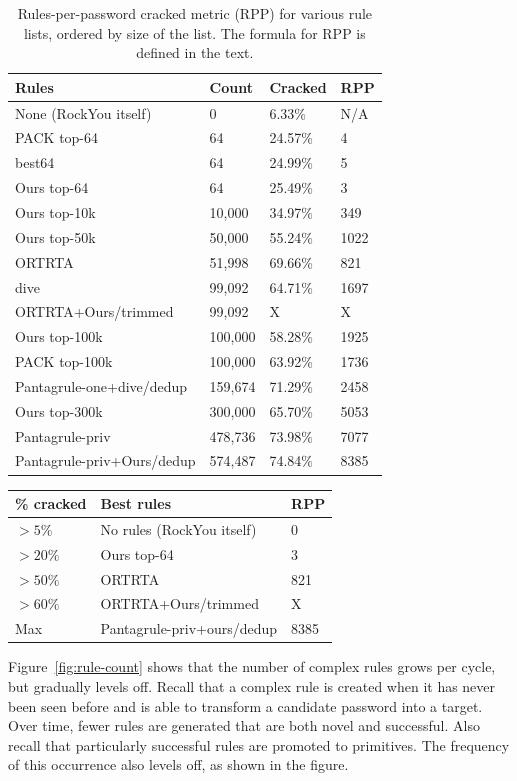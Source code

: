 \documentclass[letterpaper,twocolumn,10pt]{article}
\begin{document}
\begin{table}
\centering
\begin{tabular}{|l|l|l|l|}
  \hline
  Rules & Count & Cracked & RPP \\
  \hline
  None (RockYou itself) & 0 & 6.33\% & N/A \\
  PACK top-64 & 64 & 24.57\% & 4 \\
  best64 & 64 & 24.99\% & 5 \\
  Ours top-64 & 64 & 25.49\% & 3 \\
  Ours top-10k & 10,000 & 34.97\% & 349 \\
  Ours top-50k & 50,000 & 55.24\% & 1022 \\
  ORTRTA & 51,998 & 69.66\% & 821 \\
  dive & 99,092 & 64.71\% & 1697 \\
  ORTRTA+Ours/trimmed & 99,092 & X & X \\
  Ours top-100k & 100,000 & 58.28\% & 1925 \\
  PACK top-100k & 100,000 & 63.92\% & 1736 \\
  Pantagrule-one+dive/dedup & 159,674 & 71.29\% & 2458 \\
  Ours top-300k & 300,000 & 65.70\% & 5053 \\
  Pantagrule-priv & 478,736 & 73.98\% & 7077 \\
  Pantagrule-priv+Ours/dedup & 574,487 & 74.84\% & 8385 \\
  \hline
\end{tabular}
\caption{Rules-per-password cracked metric (RPP) for various rule lists, ordered by size of the list. The formula for RPP is defined in the text.}
\label{tab:rpp}
\end{table}

\begin{table}
\centering
\begin{tabular}{|l|l|l|}
    \hline
    \% cracked & Best rules & RPP \\
    \hline
    $>5\%$ & No rules (RockYou itself) & 0 \\
    $>20\%$ & Ours top-64 & 3 \\
    $>50\%$ & ORTRTA & 821 \\
    $>60\%$ & ORTRTA+Ours/trimmed & X \\
    Max & Pantagrule-priv+ours/dedup & 8385 \\
    \hline
\end{tabular}
\end{table}

Figure~\ref{fig:rule-count} shows that the number of complex rules grows per
cycle, but gradually levels off. Recall that a complex rule is created when it
has never been seen before and is able to transform a candidate password into a
target. Over time, fewer rules are generated that are both novel and
successful. Also recall that particularly successful rules are promoted to
primitives. The frequency of this occurrence also levels off, as shown in the
figure.
\end{document}
